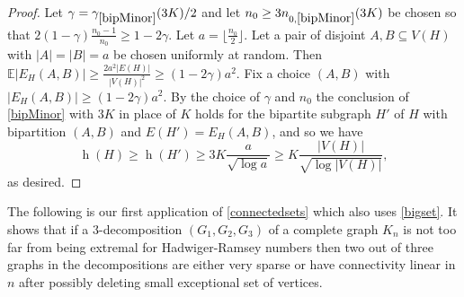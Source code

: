\documentclass{article}
\newtheorem{lem}[thm]{Lemma}
\newcommand{\eps}{\varepsilon}
\newcommand{\bb}[1]{\mathbb{#1}}
\DeclareMathOperator{\had}{h}
\begin{document}

\begin{proof} Let $\gamma= \gamma_{\ref{bipMinor}}(3K)/2$ and let $n_0 \geq 3n_{0,\ref{bipMinor}}(3K)$ be chosen so that $2(1-\gamma)\frac{n_0-1}{n_0} \geq 1 - 2\gamma$.
	Let $a = \lfloor\frac{n_0}{2}\rfloor$. Let a pair of disjoint $A,B \subseteq V(H)$  with $|A|=|B|=a$ be chosen uniformly at random. Then $\bb{E}|E_H(A,B)| \geq \frac{2a^2|E(H)|}{|V(H)|^2} \geq (1-2\gamma)a^2.$ Fix a choice $(A,B)$ with $|E_H(A,B)| \geq (1-2\gamma)a^2$. By the choice of $\gamma$ and $n_0$ the conclusion of \cref{bipMinor} with $3K$ in place of $K$ holds for the bipartite subgraph $H'$ of $H$ with bipartition $(A,B)$ and $E(H')=E_H(A,B)$, and so we have $$\had(H) \geq \had(H') \geq 3K \frac{a}{\sqrt{\log{a}}} \geq K \frac{|V(H)|}{\sqrt{\log{|V(H)|}}},$$
	as desired.
\end{proof}	


The following is our first application of \cref{connectedsets} which also uses \cref{bigset}. It shows that if a $3$-decomposition $(G_1,G_2,G_3)$ of a complete graph $K_n$ is not too far from being extremal for Hadwiger-Ramsey numbers then two out of three graphs in the decompositions are either very sparse or have connectivity linear in $n$ after possibly deleting small exceptional set of vertices.                    

\end{document}
